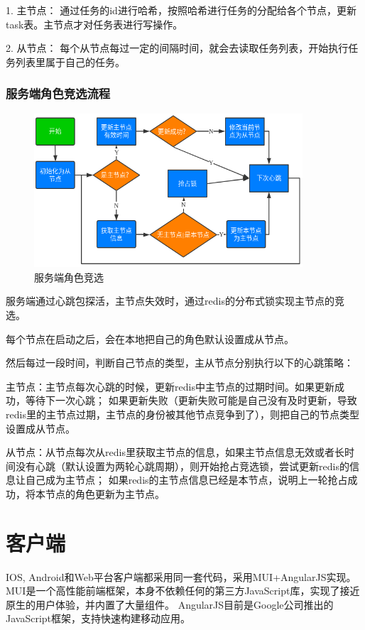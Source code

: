 1. 主节点： 通过任务的id进行哈希，按照哈希进行任务的分配给各个节点，更新task表。主节点才对任务表进行写操作。

2. 从节点： 每个从节点每过一定的间隔时间，就会去读取任务列表，开始执行任务列表里属于自己的任务。

\subsubsection{服务端角色竞选流程}
\begin{figure}
    \centering
    \includegraphics[width=10cm]{images/slave-master.png}
    \caption{服务端角色竞选}
    \label{fig:slave_master}
\end{figure}

服务端通过心跳包探活，主节点失效时，通过redis的分布式锁实现主节点的竞选。

每个节点在启动之后，会在本地把自己的角色默认设置成从节点。

然后每过一段时间，判断自己节点的类型，主从节点分别执行以下的心跳策略：

主节点：主节点每次心跳的时候，更新redis中主节点的过期时间。如果更新成功，等待下一次心跳； 
如果更新失败（更新失败可能是自己没有及时更新，导致redis里的主节点过期，主节点的身份被其他节点竞争到了），则把自己的节点类型设置成从节点。

从节点：从节点每次从redis里获取主节点的信息，如果主节点信息无效或者长时间没有心跳（默认设置为两轮心跳周期），则开始抢占竞选锁，尝试更新redis的信息让自己成为主节点；
如果redis的主节点信息已经是本节点，说明上一轮抢占成功，将本节点的角色更新为主节点。


\section{客户端}
IOS, Android和Web平台客户端都采用同一套代码，采用MUI+AngularJS实现。
MUI是一个高性能前端框架，本身不依赖任何的第三方JavaScript库，实现了接近原生的用户体验，并内置了大量组件。
AngularJS目前是Google公司推出的JavaScript框架，支持快速构建移动应用。

